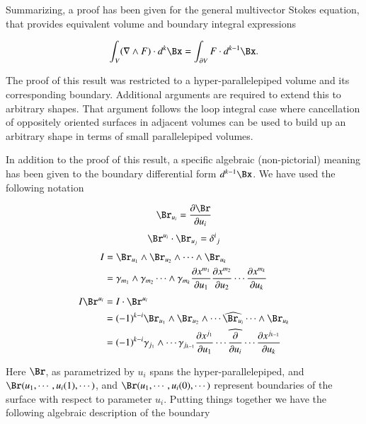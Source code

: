 Summarizing, a proof has been given for the general multivector Stokes equation, that provides
equivalent volume and boundary integral expressions

\begin{equation}\label{eqn:stokesR:genstokesSummary}
\int_V (\grad \wedge F) \cdot d^{k}\Bx = \int_{\partial V} F \cdot d^{k-1}\Bx.
\end{equation}

The proof of this result was restricted to a hyper-parallelepiped volume and its corresponding boundary.  Additional
arguments are required to extend this to arbitrary shapes.  That argument follows the loop integral case where cancellation
of oppositely oriented surfaces in adjacent volumes can be used to build up an arbitrary shape in terms of small 
parallelepiped volumes.

In addition to the proof of this result, a specific algebraic (non-pictorial) meaning has been given to the boundary
differential form $d^{k-1}\Bx$.  We have used the following notation

\begin{equation}
\Br_{u_i} = \PD{u_i}{\Br}
\end{equation}
\begin{equation}
\Br^{u_i} \cdot \Br_{u_j} = {\delta^i}_j
\end{equation}
\begin{align}
I &= \Br_{u_1} \wedge \Br_{u_2} \wedge \cdots \wedge \Br_{u_k} \\
  &= \gamma_{m_1} \wedge \gamma_{m_2} \cdots \wedge \gamma_{m_{k}} \PD{u_1}{x^{m_1}} \PD{u_2}{x^{m_2}} \cdots \PD{u_k}{x^{m_k}} \\
\end{align}
\begin{align*}
I \Br^{u_i} &= I \cdot \Br^{u_i} \\
&= (-1)^{k-i} \Br_{u_1} \wedge \Br_{u_2} \wedge \cdots \widehat{\Br_{u_i}} \cdots \wedge \Br_{u_k} \\
&= (-1)^{k-i} 
\gamma_{j_1} \wedge \cdots \gamma_{j_{k-1}} 
\PD{u_1}{x^{j_1}} \cdots \widehat{\PD{u_i}{}} \cdots \PD{u_k}{x^{j_{k-1}}}
\end{align*}

Here $\Br$, as parametrized by $u_i$ spans the hyper-parallelepiped, and 
$\Br(u_1, \cdots, u_i(1), \cdots)$, and $\Br(u_1, \cdots, u_i(0), \cdots)$ represent boundaries of the surface with respect to
parameter $u_i$.  Putting things together we have the following algebraic description of the boundary

